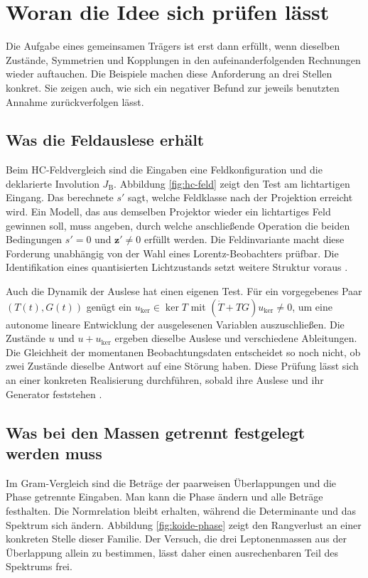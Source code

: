 \section{Woran die Idee sich prüfen lässt}
\label{sec:tests}

Die Aufgabe eines gemeinsamen Trägers ist erst dann erfüllt, wenn dieselben Zustände, Symmetrien und Kopplungen in den aufeinanderfolgenden Rechnungen wieder auftauchen. Die Beispiele machen diese Anforderung an drei Stellen konkret. Sie zeigen auch, wie sich ein negativer Befund zur jeweils benutzten Annahme zurückverfolgen lässt.

\subsection{Was die Feldauslese erhält}

Beim HC-Feldvergleich sind die Eingaben eine Feldkonfiguration und die deklarierte Involution \(J_{\mathrm B}\). Abbildung \ref{fig:hc-feld} zeigt den Test am lichtartigen Eingang. Das berechnete \(s'\) sagt, welche Feldklasse nach der Projektion erreicht wird. Ein Modell, das aus demselben Projektor wieder ein lichtartiges Feld gewinnen soll, muss angeben, durch welche anschließende Operation die beiden Bedingungen \(s'=0\) und \(\mathbf z'\ne0\) erfüllt werden. Die Feldinvariante macht diese Forderung unabhängig von der Wahl eines Lorentz-Beobachters prüfbar. Die Identifikation eines quantisierten Lichtzustands setzt weitere Struktur voraus \cite{feldkern,feldsektoren}.

Auch die Dynamik der Auslese hat einen eigenen Test. Für ein vorgegebenes Paar \((T(t),\allowbreak G(t))\) genügt ein \(u_{\ker}\in\ker T\) mit \((\dot T+TG)u_{\ker}\ne0\), um eine autonome lineare Entwicklung der ausgelesenen Variablen auszuschließen. Die Zustände \(u\) und \(u+u_{\ker}\) ergeben dieselbe Auslese und verschiedene Ableitungen. Die Gleichheit der momentanen Beobachtungsdaten entscheidet so noch nicht, ob zwei Zustände dieselbe Antwort auf eine Störung haben. Diese Prüfung lässt sich an einer konkreten Realisierung durchführen, sobald ihre Auslese und ihr Generator feststehen \cite{physics}.

\subsection{Was bei den Massen getrennt festgelegt werden muss}

Im Gram-Vergleich sind die Beträge der paarweisen Überlappungen und die Phase getrennte Eingaben. Man kann die Phase ändern und alle Beträge festhalten. Die Normrelation bleibt erhalten, während die Determinante und das Spektrum sich ändern. Abbildung \ref{fig:koide-phase} zeigt den Rangverlust an einer konkreten Stelle dieser Familie. Der Versuch, die drei Leptonenmassen aus der Überlappung allein zu bestimmen, lässt daher einen ausrechenbaren Teil des Spektrums frei.

